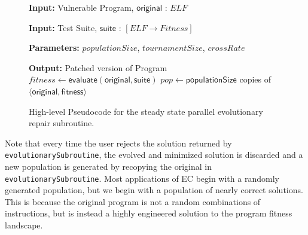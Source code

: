 \documentclass{sigcomm-alternate}
\begin{document}
\begin{figure}[htb]
\begin{algorithmic}[1]
\small
\item[{\textbf{Input: }} {Vulnerable Program, $\mathsf{original}$ : $ELF$}]
\item[{\textbf{Input: }} {Test Suite, $\mathsf{suite}$ : $[ELF \rightarrow Fitness]$}]
\item[{\textbf{Parameters: }} {$populationSize$, $tournamentSize$, $crossRate$}]
\item[{\textbf{Output: }} {Patched version of Program}] 
   $fitness \leftarrow \mathsf{evaluate}(\mathsf{original}, \mathsf{suite})$ 
   $pop \leftarrow \mathsf{populationSize}$ copies of $\langle \mathsf{original}, \mathsf{fitness} \rangle$
\end{algorithmic}
\caption{\label{evolutionary-subroutine}High-level Pseudocode for the
steady state parallel evolutionary repair subroutine.}
\end{figure}

\noindent Note that every time the user rejects the
solution returned by \texttt{evolutionarySubroutine}, the evolved and
minimized solution is discarded and a new population is generated by
recopying the original in \texttt{evolutionarySubroutine}. 
Most applications of EC begin with a randomly generated population,
but we begin with a population of nearly correct solutions.
This is because the original program is not a random
combinations of instructions, but is instead 
a highly engineered solution to the program fitness
landscape.  
\end{document}
